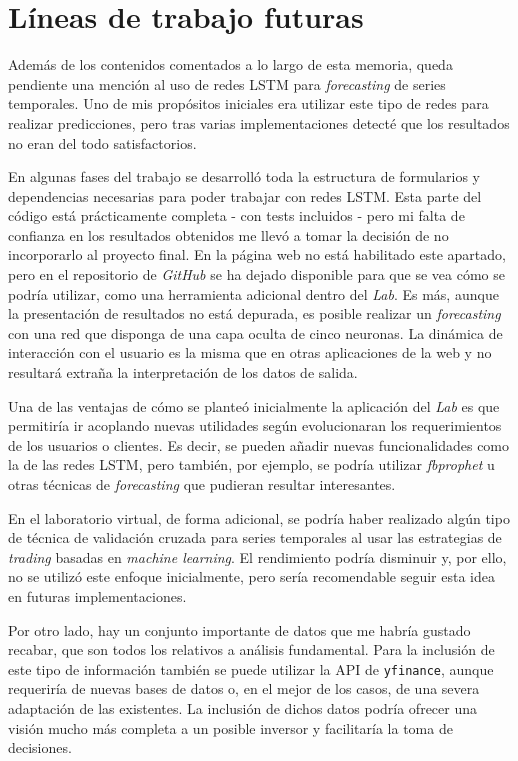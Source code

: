 \section{Líneas de trabajo futuras} 

Además de los contenidos comentados a lo largo de esta memoria, queda pendiente una mención al uso de redes LSTM\citep{wiki:lstm} para \emph{forecasting} de series temporales. Uno de mis propósitos iniciales era utilizar este tipo de redes para realizar predicciones, pero tras varias implementaciones detecté que los resultados no eran del todo satisfactorios. 

En algunas fases del trabajo se desarrolló toda la estructura de formularios y dependencias necesarias para poder trabajar con redes LSTM. Esta parte del código está prácticamente completa - con tests incluidos - pero mi falta de confianza en los resultados obtenidos me llevó a tomar la decisión de no incorporarlo al proyecto final. En la página web no está habilitado este apartado, pero en el repositorio de \emph{GitHub} se ha dejado disponible para que se vea cómo se podría utilizar, como una herramienta adicional dentro del \emph{Lab}. Es más, aunque la presentación de resultados no está depurada, es posible realizar un \emph{forecasting} con una red que disponga de una capa oculta de cinco neuronas. La dinámica de interacción con el usuario es la misma que en otras aplicaciones de la web y no resultará extraña la interpretación de los datos de salida. 

Una de las ventajas de cómo se planteó inicialmente la aplicación del \emph{Lab} es que permitiría ir acoplando nuevas utilidades según evolucionaran los requerimientos de los usuarios o clientes. Es decir, se pueden añadir nuevas funcionalidades como la de las redes LSTM, pero también, por ejemplo, se podría utilizar \emph{fbprophet}\citep{online:fbprophet} u otras técnicas de \emph{forecasting} que pudieran resultar interesantes. 

En el laboratorio virtual, de forma adicional, se podría haber realizado algún tipo de técnica de validación cruzada para series temporales \citep{wiki:cross_val_series_temporales} al usar las estrategias de \emph{trading} basadas en \emph{machine learning}. El rendimiento podría disminuir y, por ello, no se utilizó este enfoque inicialmente, pero sería recomendable seguir esta idea en futuras implementaciones.

Por otro lado, hay un conjunto importante de datos que me habría gustado recabar, que son todos los relativos a análisis fundamental\citep{wiki:analisis_fundamental}. Para la inclusión de este tipo de información también se puede utilizar la API de \texttt{yfinance}, aunque requeriría de nuevas bases de datos o, en el mejor de los casos, de una severa adaptación de las existentes. La inclusión de dichos datos podría ofrecer una visión mucho más completa a un posible inversor y facilitaría la toma de decisiones.

